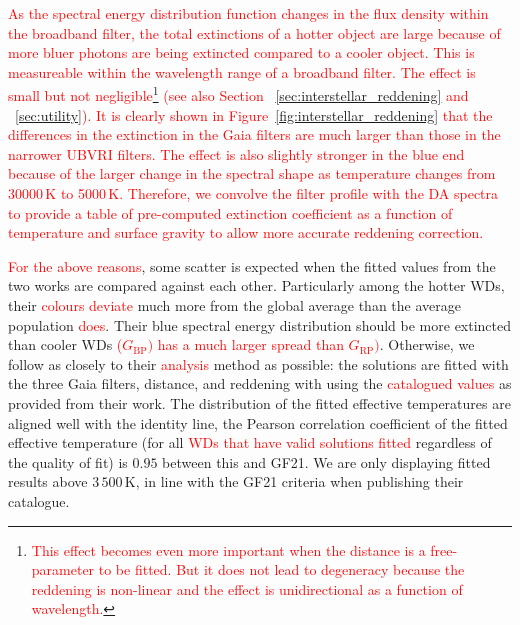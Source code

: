 \documentclass[fleqn,usenatbib]{rasti}
\begin{document}
\textcolor{red}{
As the spectral energy distribution function changes in the flux density
within the broadband filter, the total extinctions of a hotter object are
large because of more bluer photons are being extincted compared to a cooler
object. This is measureable within the wavelength range of a broadband filter.
The effect is small but not negligible\footnote{\textcolor{red}{This effect
becomes even more important when the distance is a free-parameter to be fitted.
But it does not lead to degeneracy because the reddening is non-linear and
the effect is unidirectional as a function of wavelength.}} (see also Section
\textsection~\ref{sec:interstellar_reddening} and \textsection~\ref{sec:utility}).
It is clearly shown in Figure~\ref{fig:interstellar_reddening} that the
differences in the extinction in the Gaia filters are much larger than
those in the narrower UBVRI filters. The effect is also slightly
stronger in the blue end because of the larger change in the spectral
shape as temperature changes from 30000\,K to 5000\,K. Therefore, we
convolve the filter profile with the DA spectra to provide a table of
pre-computed extinction coefficient as a function of temperature and
surface gravity to allow more accurate reddening correction.}

\textcolor{red}{For the above reasons}, some scatter is expected when the
fitted values from the two works are compared against each other.
Particularly among the hotter WDs, their \textcolor{red}{colours deviate}
much more from the global average than the average population
\textcolor{red}{does}. Their blue spectral energy distribution should be more
extincted than cooler WDs \textcolor{red}{($G_{\mathrm{BP}})$ has a much
larger spread than $G_{\mathrm{RP}})$}. Otherwise, we follow as closely
to their \textcolor{red}{analysis} method as possible: the solutions are
fitted with the three Gaia filters, distance, and reddening with using the
\textcolor{red}{catalogued values} as provided from their work.
The distribution of the fitted effective temperatures are aligned well with
the identity line, the Pearson correlation coefficient of the fitted effective
temperature (for all \textcolor{red}{WDs that have valid solutions fitted}
regardless of the quality of fit) is $0.95$ between this and GF21. We are
only displaying fitted results above $3\,500$\,K, in line with the GF21
criteria when publishing their catalogue.
\end{document}
